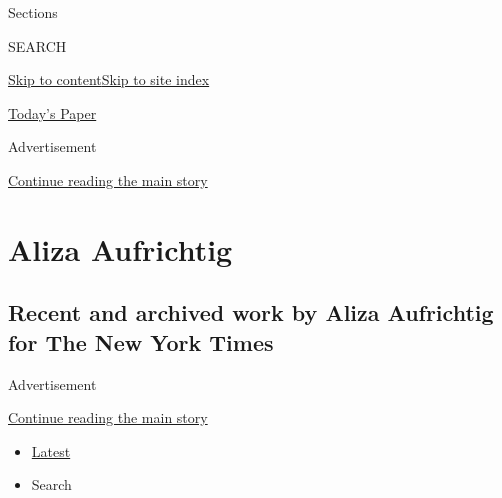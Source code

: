 Sections

SEARCH

\protect\hyperlink{site-content}{Skip to
content}\protect\hyperlink{site-index}{Skip to site index}

\href{https://myaccount.nytimes.com/auth/login?response_type=cookie\&client_id=vi}{}

\href{https://www.nytimes.com/section/todayspaper}{Today's Paper}

Advertisement

\protect\hyperlink{after-top}{Continue reading the main story}

\hypertarget{aliza-aufrichtig}{%
\section{Aliza Aufrichtig}\label{aliza-aufrichtig}}

\hypertarget{recent-and-archived-work-by-aliza-aufrichtig-for-the-new-york-times}{%
\subsection{Recent and archived work by Aliza Aufrichtig for The New
York
Times}\label{recent-and-archived-work-by-aliza-aufrichtig-for-the-new-york-times}}

Advertisement

\protect\hyperlink{after-mid1}{Continue reading the main story}

\begin{itemize}
\tightlist
\item
  \protect\hyperlink{stream-panel}{Latest}
\item
  Search
\end{itemize}

